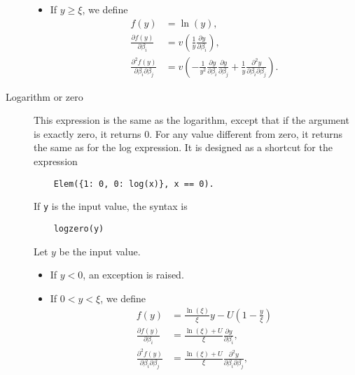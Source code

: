 \documentclass[12pt,a4paper]{article}
\begin{document}
\begin{description}
\begin{itemize}
  \item If $y \geq \xi$, we define
    \begin{align*}
    f(y)& =\ln(y), \\ 
    \frac{\partial f(y)}{\partial \beta_i} &= v\left(\frac{1}{y} \frac{\partial y}{\partial \beta_i}\right), \\
    \frac{\partial^2 f(y)}{\partial \beta_i \partial \beta_j} &=
    v\left(-\frac{1}{y^{2}}
    \frac{\partial y}{\partial \beta_i}
    \frac{\partial y}{\partial \beta_j }
    + \frac{1}{y}
    \frac{\partial^2 y}{\partial \beta_i \partial \beta_j}
      \right).
    \end{align*}
  \end{itemize}


\item[Logarithm or zero] This expression is the same as the logarithm, except that if the argument is exactly zero, it returns 0. For any value different from zero, it returns the same as for the log expression. It is designed as a shortcut for the expression
  \begin{lstlisting}
    Elem({1: 0, 0: log(x)}, x == 0).
  \end{lstlisting}

  If \lstinline+y+ is the input value, the syntax is
  \begin{lstlisting}
    logzero(y)
  \end{lstlisting}
    Let $y$ be the input value.
  \begin{itemize}
  \item If $y < 0$, an exception is raised.
  \item If $0 < y < \xi$, we define
    \begin{align*}
      f(y) &=  \frac{\ln(\xi)}{\xi}  y -U \left(1 - \frac{y}{\xi}\right)\\
      \frac{\partial f(y)}{\partial \beta_i} &= \frac{\ln(\xi) + U}{\xi} \frac{\partial y}{\partial \beta_i},\\
      \frac{\partial^2 f(y)}{\partial \beta_i\partial \beta_j} &=  \frac{\ln(\xi) + U}{\xi} \frac{\partial^2 y}{\partial \beta_i \partial \beta_j},\\
    \end{align*}


\end{itemize}
\end{description}
\end{document}
